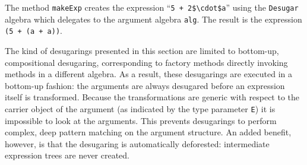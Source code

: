 
\noindent The method \lstinline{makeExp} creates the expression ``\lstinline[mathescape=true]{5 + 2$\cdot$a}'' using the \lstinline{Desugar} algebra which delegates to the argument algebra \lstinline{alg}. The result is the expression \lstinline{(5 + (a + a))}.

The kind of desugarings presented in this section are limited to bottom-up, compositional desugaring, corresponding to factory methods directly invoking methods in a different algebra. As a result, these desugarings are executed in a bottom-up fashion: the arguments are always desugared before an expression itself is transformed. Because the transformations are generic with respect to the carrier object of the argument (as indicated by the type parameter \lstinline{E}) it is impossible to look at the arguments. This prevents desugarings to perform complex, deep pattern matching on the argument structure. An added benefit, however, is that the desugaring is automatically deforested: intermediate expression trees are never created.
